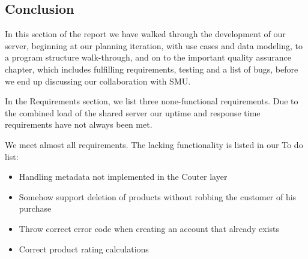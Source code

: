 \subsection{Conclusion}
\label{serverconclusion}
In this section of the report we have walked through the development of our server, beginning at our planning iteration, with use cases and data modeling, to a program structure walk-through, and on to the important quality assurance chapter, which includes fulfilling requirements, testing and a list of bugs, before we end up discussing our collaboration with SMU.

In the Requirements section, we list three none-functional requirements. Due to the combined load of the shared server our uptime and response time requirements have not always been met.

We meet almost all requirements. The lacking functionality is listed in our To do list:
\begin{itemize}
\item Handling metadata not implemented in the C\Sh outer layer
\item Somehow support deletion of products without robbing the customer of his purchase
\item Throw correct error code when creating an account that already exists
\item Correct product rating calculations
\end{itemize}

\newpage